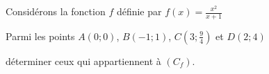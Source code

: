 \begin{Application}[][5 min]
\noindent
Considérons la fonction $f$ définie par $f(x) = \frac{x^2}{x+1}$

Parmi les points $A(0;0)$, $B(-1;1)$, $C\left(3;\frac{9}{4}\right)$ et $D(2;4)$

déterminer ceux qui appartiennent à $(C_f)$.
\end{Application}
